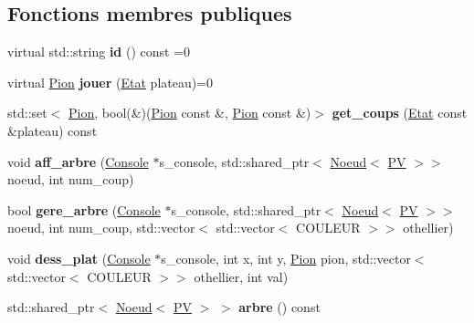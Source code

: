 \subsection*{Fonctions membres publiques}
\begin{DoxyCompactItemize}
\item 
virtual std\+::string {\bfseries id} () const =0\hypertarget{classIA_a766f10d2cd5450868523e2fa184fdf93}{}\label{classIA_a766f10d2cd5450868523e2fa184fdf93}

\item 
virtual \hyperlink{structPion}{Pion} {\bfseries jouer} (\hyperlink{structEtat}{Etat} plateau)=0\hypertarget{classIA_a3f40133e71c6bbe7fe7c72b4792dccb4}{}\label{classIA_a3f40133e71c6bbe7fe7c72b4792dccb4}

\item 
std\+::set$<$ \hyperlink{structPion}{Pion}, bool(\&)(\hyperlink{structPion}{Pion} const \&, \hyperlink{structPion}{Pion} const \&)$>$ {\bfseries get\+\_\+coups} (\hyperlink{structEtat}{Etat} const \&plateau) const \hypertarget{classIA_a6a1a014ffa6b3dbf6c1f401ecfa55148}{}\label{classIA_a6a1a014ffa6b3dbf6c1f401ecfa55148}

\item 
void {\bfseries aff\+\_\+arbre} (\hyperlink{classConsole}{Console} $\ast$s\+\_\+console, std\+::shared\+\_\+ptr$<$ \hyperlink{classNoeud}{Noeud}$<$ \hyperlink{structIA_1_1PV}{PV} $>$$>$ noeud, int num\+\_\+coup)\hypertarget{classIA_aca13a5971e87f358cd9e70188448b698}{}\label{classIA_aca13a5971e87f358cd9e70188448b698}

\item 
bool {\bfseries gere\+\_\+arbre} (\hyperlink{classConsole}{Console} $\ast$s\+\_\+console, std\+::shared\+\_\+ptr$<$ \hyperlink{classNoeud}{Noeud}$<$ \hyperlink{structIA_1_1PV}{PV} $>$$>$ noeud, int num\+\_\+coup, std\+::vector$<$ std\+::vector$<$ C\+O\+U\+L\+E\+UR $>$$>$ othellier)\hypertarget{classIA_aa2896700500f380a77b8efc6dff9ed5e}{}\label{classIA_aa2896700500f380a77b8efc6dff9ed5e}

\item 
void {\bfseries dess\+\_\+plat} (\hyperlink{classConsole}{Console} $\ast$s\+\_\+console, int x, int y, \hyperlink{structPion}{Pion} pion, std\+::vector$<$ std\+::vector$<$ C\+O\+U\+L\+E\+UR $>$$>$ othellier, int val)\hypertarget{classIA_a2bb3de5d20fb887a3e88d6b0d698c381}{}\label{classIA_a2bb3de5d20fb887a3e88d6b0d698c381}

\item 
std\+::shared\+\_\+ptr$<$ \hyperlink{classNoeud}{Noeud}$<$ \hyperlink{structIA_1_1PV}{PV} $>$ $>$ {\bfseries arbre} () const \hypertarget{classIA_a27c2b1942849e7fbd4c77f4c0fa0d88d}{}\label{classIA_a27c2b1942849e7fbd4c77f4c0fa0d88d}

\end{DoxyCompactItemize}
